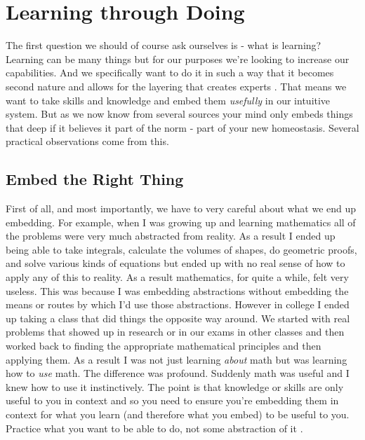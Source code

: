 \documentclass[11pt,a5paper]{book}
\begin{document}
\section{Learning through Doing}
The first question we should of course ask ourselves is - what is learning? Learning can be many things but for our purposes we're looking to increase our capabilities. And we specifically want to do it in such a way that it becomes second nature and allows for the layering that creates experts \cite{ericsson}. That means we want to take skills and knowledge and embed them \textit{usefully} in our intuitive system. But as we now know from several sources \cite{duhigg} \cite{ericsson} your mind only embeds things that deep if it believes it part of the norm - part of your new homeostasis. Several practical observations come from this.
\newline

\subsection{Embed the Right Thing}

First of all, and most importantly, we have to very careful about what we end up embedding. For example, when I was growing up and learning mathematics all of the problems were very much abstracted from reality. As a result I ended up being able to take integrals, calculate the volumes of shapes, do geometric proofs, and solve various kinds of equations but ended up with no real sense of how to apply any of this to reality. As a result mathematics, for quite a while, felt very useless. This was because I was embedding abstractions without embedding the means or routes by which I'd use those abstractions. However in college I ended up taking a class that did things the opposite way around. We started with real problems that showed up in research or in our exams in other classes and then worked back to finding the appropriate mathematical principles and then applying them. As a result I was not just learning \textit{about} math but was learning how to \textit{use} math. The difference was profound. Suddenly math was useful and I knew how to use it instinctively. The point is that knowledge or skills are only useful to you in context and so you need to ensure you're embedding them in context for what you learn (and therefore what you embed) to be useful to you. Practice what you want to be able to do, not some abstraction of it \cite{stick}.
\newline
\end{document}
